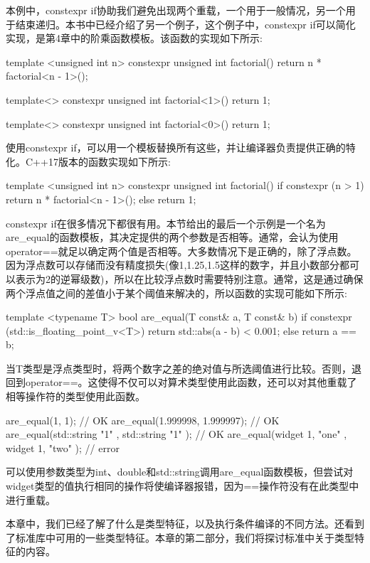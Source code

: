 本例中，constexpr if协助我们避免出现两个重载，一个用于一般情况，另一个用于结束递归。本书中已经介绍了另一个例子，这个例子中，constexpr if可以简化实现，是第4章中的阶乘函数模板。该函数的实现如下所示:

\begin{cpp}
template <unsigned int n>
constexpr unsigned int factorial()
{
	return n * factorial<n - 1>();
}

template<>
constexpr unsigned int factorial<1>() { return 1; }

template<>
constexpr unsigned int factorial<0>() { return 1; }
\end{cpp}

使用constexpr if，可以用一个模板替换所有这些，并让编译器负责提供正确的特化。C++17版本的函数实现如下所示:

\begin{cpp}
template <unsigned int n>
constexpr unsigned int factorial()
{
	if constexpr (n > 1)
		return n * factorial<n - 1>();
	else
		return 1;
}
\end{cpp}

constexpr if在很多情况下都很有用。本节给出的最后一个示例是一个名为are\_equal的函数模板，其决定提供的两个参数是否相等。通常，会认为使用operator==就足以确定两个值是否相等。大多数情况下是正确的，除了浮点数。因为浮点数可以存储而没有精度损失(像1,1.25,1.5这样的数字，并且小数部分都可以表示为2的逆幂级数)，所以在比较浮点数时需要特别注意。通常，这是通过确保两个浮点值之间的差值小于某个阈值来解决的，所以函数的实现可能如下所示:

\begin{cpp}
template <typename T>
bool are_equal(T const& a, T const& b)
{
	if constexpr (std::is_floating_point_v<T>)
		return std::abs(a - b) < 0.001;
	else
		return a == b;
}
\end{cpp}

当T类型是浮点类型时，将两个数字之差的绝对值与所选阈值进行比较。否则，退回到operator==。这使得不仅可以对算术类型使用此函数，还可以对其他重载了相等操作符的类型使用此函数。

\begin{cpp}
are_equal(1, 1); // OK
are_equal(1.999998, 1.999997); // OK
are_equal(std::string{ "1" }, std::string{ "1" }); // OK
are_equal(widget{ 1, "one" }, widget{ 1, "two" }); // error
\end{cpp}

可以使用参数类型为int、double和std::string调用are\_equal函数模板，但尝试对widget类型的值执行相同的操作将使编译器报错，因为==操作符没有在此类型中进行重载。

本章中，我们已经了解了什么是类型特征，以及执行条件编译的不同方法。还看到了标准库中可用的一些类型特征。本章的第二部分，我们将探讨标准中关于类型特征的内容。






































